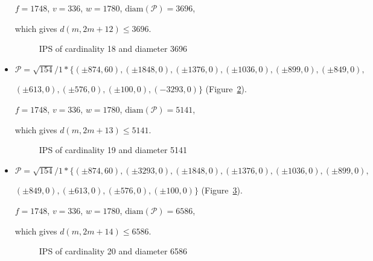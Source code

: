 \documentclass[12pt]{article}
\theoremstyle{theorem}
\theoremstyle{dfn}
\theoremstyle{remark}
\begin{document}
\begin{itemize}
$f = 1748$, $v = 336$, $w = 1780$, $\operatorname{diam(\mathcal{P})} = 3696$,

which gives $d(m, 2m + 12) \leq 3696$.


\begin{figure}[h!]
\parbox{0.85\linewidth}{\caption{IPS of cardinality 18 and diameter 3696}
\label{picture_14.png}}
\end{figure}


\item
$\mathcal{P}=\sqrt{154}/{1} * \{ (\pm 874, 60),
(\pm 1848 , 0),
(\pm 1376 , 0),
(\pm 1036 , 0),
(\pm 899 , 0),
(\pm 849 , 0),
$

$
(\pm 613 , 0),
(\pm 576 , 0),
(\pm 100 , 0),
(-3293 , 0)\}
$
(Figure~\ref{picture_15.png}).

$f = 1748$, $v = 336$, $w = 1780$, $\operatorname{diam(\mathcal{P})} = 5141$,

which gives $d(m, 2m + 13) \leq 5141$.


\begin{figure}[h!]
\parbox{1\linewidth}{\caption{IPS of cardinality 19 and diameter 5141}
\label{picture_15.png}}
\end{figure}


\item
$\mathcal{P}=\sqrt{154}/{1} * \{ (\pm 874, 60),
(\pm 3293 , 0),
(\pm 1848 , 0),
(\pm 1376 , 0),
(\pm 1036 , 0),
(\pm 899 , 0),
$

$
(\pm 849 , 0),
(\pm 613 , 0),
(\pm 576 , 0),
(\pm 100 , 0)\}
$
(Figure~\ref{picture_16.png}).

$f = 1748$, $v = 336$, $w = 1780$, $\operatorname{diam(\mathcal{P})} = 6586$,

which gives $d(m, 2m + 14) \leq 6586$.


\begin{figure}[h!]
\parbox{1\linewidth}{\caption{IPS of cardinality 20 and diameter 6586}
\label{picture_16.png}}
\end{figure}



\end{itemize}
\end{document}
